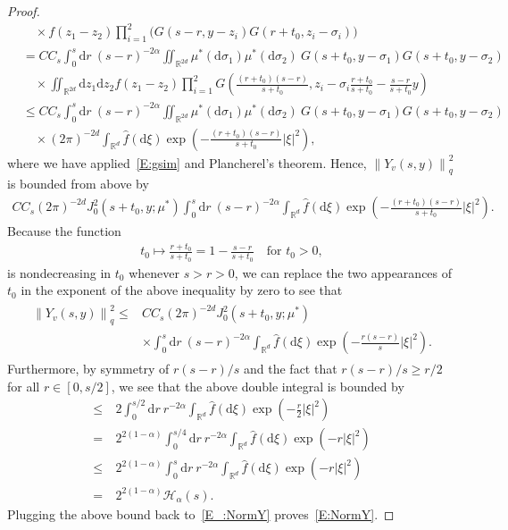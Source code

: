 \documentclass[sn-mathphys]{sn-jnl}%
\renewcommand{\R}{\mathbb{R}}
\newcommand{\Norm}[1]{\left\| #1 \right\|}
\newcommand{\ud}{\ensuremath{\mathrm{d}}}
\numberwithin{equation}{section}
\theoremstyle{thmstyleone}%
\theoremstyle{thmstyletwo}%
\theoremstyle{thmstylethree}%
\begin{document}
\begin{proof}
\begin{align*}
    & \quad \times f(z_1-z_2) \prod_{i = 1}^{2} \bigg(G(s-r,y-z_i)G(r + t_0,z_i-\sigma_i) \bigg)                                                                               \\
    & = C C_s\int_0^s \ud r \: (s-r)^{-2\alpha} \iint_{\R^{2d}} \mu^* (\ud \sigma_1) \mu^* (\ud \sigma_2)\: G(s + t_0,y-\sigma_1)G(s + t_0,y-\sigma_2)                         \\
    & \quad \times\iint_{\R^{2d}} \ud z_1\ud z_2 f(z_1-z_2) \prod_{i = 1}^2 G\left(\frac{(r+t_0)(s-r)}{s + t_0}, z_i-\sigma_i\frac{r + t_0}{s + t_0}-\frac{s-r}{s+t_0}y\right) \\
    & \le C C_s\int_0^s \ud r \: (s-r)^{-2\alpha} \iint_{\R^{2d}}\mu^* (\ud \sigma_1) \mu^* (\ud \sigma_2)\: G(s + t_0,y-\sigma_1)G(s + t_0, y-\sigma_2)                       \\
    & \quad \times (2\pi)^{-2d} \int_{\R^d} \widehat{f}(\ud \xi) \exp\left(-\frac{(r + t_0)(s-r)}{s+ t_0}\lvert\xi\rvert^2\right),
  \end{align*}
  where we have applied~\eqref{E:gsim} and Plancherel's theorem. Hence, $\Norm{Y_v(s,y)}_q^2$ is
  bounded from above by
  \begin{align*}
    C C_s (2\pi)^{-2d} J_0^2\left(s + t_0,y;\mu^*\right) \int_0^s \ud r \: (s-r)^{-2\alpha} \int_{\R^d} \widehat{f}(\ud \xi)\exp\left(-\frac{(r + t_0)(s-r)}{s + t_0}\lvert\xi\rvert^2\right).
  \end{align*}
  Because the function
  \begin{align*}
    t_0 \mapsto \frac{r + t_0}{s + t_0} = 1- \frac{s-r}{s+t_0} \quad \text{for $t_0 > 0$},
  \end{align*}
  is nondecreasing in $t_0 $ whenever $s > r > 0$, we can replace the two appearances of $t_0$ in
  the exponent of the above inequality by zero to see that
  \begin{align}\label{E_:NormY}
    \begin{aligned}
      \Norm{Y_v(s,y)}_q^2 \le & C C_s (2\pi)^{-2d} J_0^2 (s + t_0,y;\mu^*) \\
                              & \times \int_0^s \ud r \: (s-r)^{-2\alpha} \int_{\R^d} \widehat{f}(\ud \xi)\exp\left(-\frac{r(s-r)}{s}\lvert\xi\rvert^2\right).
    \end{aligned}
  \end{align}
  Furthermore, by symmetry of $r(s-r)/s$ and the fact that $r(s-r)/s \ge r/2$ for all $r\in
  [0,s/2]$, we see that the above double integral is bounded by
  \begin{align*}
    \le & \: 2\int_0^{s/2} \ud r \: r^{-2\alpha}\int_{\R^d} \widehat{f}(\ud \xi)\exp\left(-\frac{r}{2}\lvert\xi\rvert^2\right)      \\
    =   & \: 2^{2(1-\alpha)} \int_0^{s/4} \ud r \: r^{-2\alpha}\int_{\R^d} \widehat{f}(\ud \xi)\exp\left(-r\lvert\xi\rvert^2\right) \\
    \le & \: 2^{2(1-\alpha)} \int_0^{s} \ud r \: r^{-2\alpha}\int_{\R^d} \widehat{f}(\ud \xi)\exp\left(-r\lvert\xi\rvert^2\right)   \\
    =   & \: 2^{2(1-\alpha)} \mathcal{H}_\alpha(s).
  \end{align*}
  Plugging the above bound back to~\eqref{E_:NormY} proves~\eqref{E:NormY}. \bigskip


\end{proof}
\end{document}
